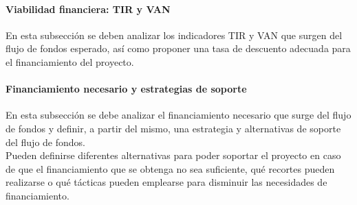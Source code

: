     \paragraph{Viabilidad financiera: TIR y VAN}
    {\consigna
    En esta subsección se deben analizar los indicadores TIR y VAN que surgen del flujo de fondos esperado, así como proponer una tasa de descuento adecuada para el financiamiento del proyecto.
    }

    \paragraph{Financiamiento necesario y estrategias de soporte}
    {\consigna
    En esta subsección se debe analizar el financiamiento necesario que surge del flujo de fondos y definir, a partir del mismo, una estrategia y alternativas de soporte del flujo de fondos.\\
    Pueden definirse diferentes alternativas para poder soportar el proyecto en caso de que el financiamiento que se obtenga no sea suficiente, qué recortes pueden realizarse o qué tácticas pueden emplearse para disminuir las necesidades de financiamiento.
    }
